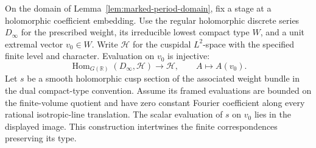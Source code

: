 \begin{auxlemma}
\label{lem:marked-lowest-reading}
On the domain of Lemma~\ref{lem:marked-period-domain}, fix a
stage at a holomorphic coefficient embedding. Use the regular
holomorphic discrete series \(D_\infty\) for the prescribed
weight, its irreducible lowest compact type \(W\), and a unit
extremal vector \(v_0\in W\). Write \(\mathcal H\) for the
cuspidal \(L^2\)-space with the specified finite level and
character. Evaluation on \(v_0\) is injective:
\[
 \operatorname{Hom}_{G(\mathbb R)}(D_\infty,\mathcal H)
       \longrightarrow\mathcal H,\qquad A\longmapsto A(v_0).
\]
Let \(s\) be a smooth holomorphic cusp section of the associated
weight bundle in the dual compact-type convention. Assume its
framed evaluations are bounded on the finite-volume quotient and
have zero constant Fourier coefficient along every rational
isotropic-line translation. The scalar evaluation of \(s\) on
\(v_0\) lies in the displayed image. This construction intertwines
the finite correspondences preserving its type.
\end{auxlemma}
